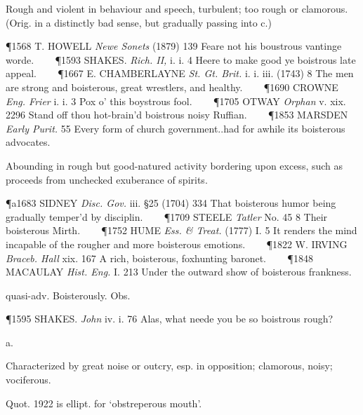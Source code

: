 \begin{description}[wide, labelwidth=!, labelindent=0pt]
\begin{myenumerate}
 Rough and violent in behaviour and speech, turbulent; too rough or clamorous. (Orig. in a distinctly bad sense, but gradually passing into c.)

\P 1568 T. HOWELL  \textit{Newe Sonets} (1879) 139 Feare not his boustrous vantinge worde.    
\P 1593 SHAKES.  \textit{Rich. II,} i. i. 4 Heere to make good ye boistrous late appeal.    
\P 1667 E. CHAMBERLAYNE  \textit{St. Gt. Brit.} i. i. iii. (1743) 8 The men are strong and boisterous, great wrestlers, and healthy.    
\P 1690 CROWNE  \textit{Eng. Frier} i. i. 3 Pox o' this boystrous fool.    
\P 1705 OTWAY  \textit{Orphan} v. xix. 2296 Stand off thou hot-brain'd boistrous noisy Ruffian.    
\P 1853 MARSDEN  \textit{Early Purit.} 55 Every form of church government..had for awhile its boisterous advocates.

 Abounding in rough but good-natured activity bordering upon excess, such as proceeds from unchecked exuberance of spirits.

\P a1683 SIDNEY  \textit{Disc. Gov.} iii. §25 (1704) 334 That boisterous humor being gradually temper'd by disciplin.    
\P 1709 STEELE  \textit{Tatler} No. 45 8 Their boisterous Mirth.    
\P 1752 HUME  \textit{Ess. \& Treat.} (1777) I. 5 It renders the mind incapable of the rougher and more boisterous emotions.    
\P 1822 W. IRVING  \textit{Braceb. Hall} xix. 167 A rich, boisterous, foxhunting baronet.    
\P 1848 MACAULAY  \textit{Hist. Eng.} I. 213 Under the outward show of boisterous frankness.

 quasi-adv. Boisterously. Obs.

\P 1595 SHAKES.  \textit{John} iv. i. 76 Alas, what neede you be so boistrous rough?
\end{myenumerate}


 a.

\noindent {}

\vspace{-0.3cm}

\begin{myenumerate}

 Characterized by great noise or outcry, esp. in opposition; clamorous, noisy; vociferous.

Quot. 1922 is ellipt.  for ‘obstreperous mouth’.


\end{myenumerate}
\end{description}
